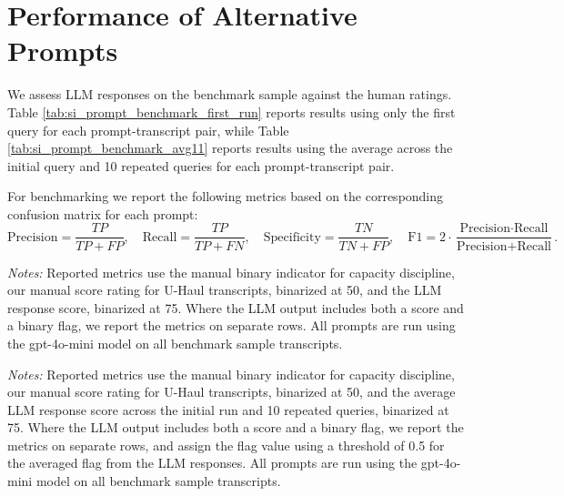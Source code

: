 \section{Performance of Alternative Prompts}\label{sec:app_prompt_comparison}

We assess LLM responses on the benchmark sample against the human ratings. Table \ref{tab:si_prompt_benchmark_first_run} reports results using only the first query for each prompt-transcript pair, while Table \ref{tab:si_prompt_benchmark_avg11} reports results using the average across the initial query and 10 repeated queries for each prompt-transcript pair.

For benchmarking we report the following metrics based on the corresponding confusion matrix for each prompt:
\begingroup
\scriptsize
\[
\text{Precision}=\frac{TP}{TP+FP},\quad
\text{Recall}=\frac{TP}{TP+FN},\quad
\text{Specificity}=\frac{TN}{TN+FP},\quad
\text{F1}=2\cdot\frac{\text{Precision}\cdot\text{Recall}}{\text{Precision}+\text{Recall}}.
\]
\endgroup

\begin{table}[!htbp]
    \centering
    \caption{Prompt Benchmarking Against Human Ratings (First LLM Run)}
    \label{tab:si_prompt_benchmark_first_run}
    \setlength{\tabcolsep}{3pt}
    \scriptsize
    \resizebox{\textwidth}{!}{}
    \begin{minipage}{\textwidth}
        \vspace{1em}
        \footnotesize
        \textit{Notes:} Reported metrics use the \textcite{aryal2022coordinated} manual binary indicator for capacity discipline, our manual score rating for U-Haul transcripts, binarized at 50, and the LLM response score, binarized at 75. Where the LLM output includes both a score and a binary flag, we report the metrics on separate rows. All prompts are run using the gpt-4o-mini model on all benchmark sample transcripts.
    \end{minipage}
\end{table}
\FloatBarrier

\begin{table}[ht]
    \centering
    \caption{Prompt Benchmarking Against Human Ratings (Average of 11 LLM Runs)}
    \label{tab:si_prompt_benchmark_avg11}
    \setlength{\tabcolsep}{3pt}
    \scriptsize
    \resizebox{\textwidth}{!}{}
    \begin{minipage}{\textwidth}
        \vspace{1em}
        \footnotesize
        \textit{Notes:} Reported metrics use the \textcite{aryal2022coordinated} manual binary indicator for capacity discipline, our manual score rating for U-Haul transcripts, binarized at 50, and the average LLM response score across the initial run and 10 repeated queries, binarized at 75. Where the LLM output includes both a score and a binary flag, we report the metrics on separate rows, and assign the flag value using a threshold of 0.5 for the averaged flag from the LLM responses. All prompts are run using the gpt-4o-mini model on all benchmark sample transcripts.
    \end{minipage}
\end{table}
\FloatBarrier
